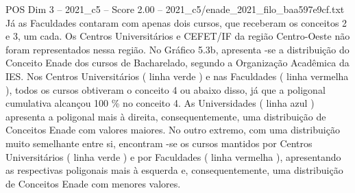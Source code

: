 \begin{textsample}{POS Dim 3 – 2021\_c5 – Score 2.00 – 2021\_c5/enade\_2021\_filo\_baa597e9cf.txt}
Já as Faculdades contaram com apenas dois cursos, que receberam os conceitos 2 e 3, um cada.
Os Centros Universitários e CEFET/IF da região Centro-Oeste não foram representados nessa região.
No Gráfico 5.3b, apresenta -se a distribuição do Conceito Enade dos cursos de Bacharelado, segundo a Organização Acadêmica da IES.
Nos Centros Universitários ( linha verde ) e nas Faculdades ( linha vermelha ), todos os cursos obtiveram o conceito 4 ou abaixo disso, já que a poligonal cumulativa alcançou 100 \% no conceito 4.
As Universidades ( linha azul ) apresenta a poligonal mais à direita, consequentemente, uma distribuição de Conceitos Enade com valores maiores.
No outro extremo, com uma distribuição muito semelhante entre si, encontram -se os cursos mantidos por Centros Universitários ( linha verde ) e por Faculdades ( linha vermelha ), apresentando as respectivas poligonais mais à esquerda e, consequentemente, uma distribuição de Conceitos Enade com menores valores.

\end{textsample}
